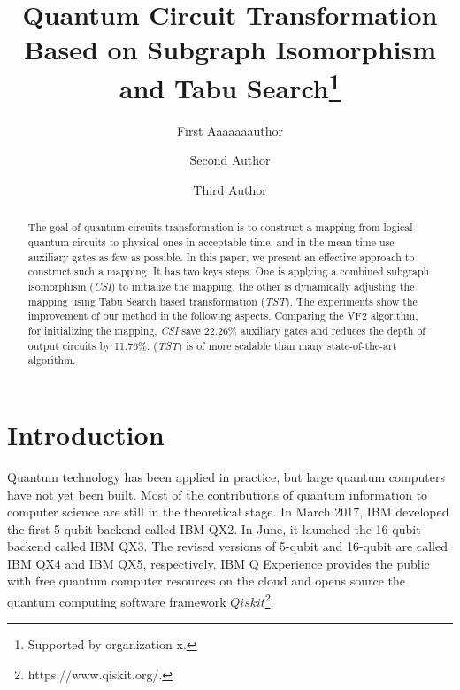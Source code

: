 \documentclass[runningheads]{llncs}
\begin{document}
%
\title{Quantum Circuit Transformation Based on Subgraph Isomorphism and Tabu Search\thanks{Supported by organization x.}}
%
%
\author{First Aaaaaaauthor \and
Second Author \and
Third Author}
%
%
%
\maketitle              %
%
\begin{abstract}
	The goal of quantum circuits transformation is to construct a mapping from logical quantum circuits to physical ones in acceptable time, and in the mean time use auxiliary gates as few as possible. In this paper, we present an effective approach to construct such a mapping. It has two keys steps. One is applying a combined subgraph isomorphism (\textit{CSI}) to initialize the mapping, the other is dynamically adjusting the mapping using Tabu Search based transformation (\textit{TST}). The experiments show the improvement of our method in the following aspects. Comparing the VF2 algorithm, for initializing the mapping, \textit{CSI} save 22.26\% auxiliary gates and reduces the depth of output circuits by 11.76\%. (\textit{TST}) is of more scalable than many state-of-the-art algorithm.
	
\end{abstract}

\section{Introduction}
\label{Introduction}
Quantum technology has been applied in practice, but large quantum computers have not yet been built. Most of the contributions of quantum information to computer science are still in the theoretical stage. In March 2017, IBM developed the first 5-qubit backend called IBM QX2.  In June, it launched the 16-qubit backend called IBM QX3. The revised versions of 5-qubit and 16-qubit are called IBM QX4 and IBM QX5, respectively. IBM Q Experience provides the public with free quantum computer resources on the cloud and opens source the quantum computing software framework $Qiskit$\footnote{https://www.qiskit.org/.}. 
\end{document}
